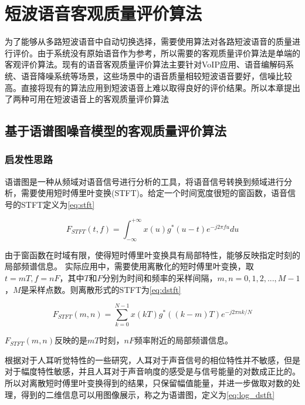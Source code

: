 \chapter{短波语音客观质量评价算法}
\label{chapter:algorithms}

为了能够从多路短波语音中自动切换选择，需要使用算法对各路短波语音的质量进行评价。由于系统没有原始语音作为参考，所以需要的客观质量评价算法是单端的客观评价算法。现有的语音客观质量评价算法主要针对VoIP应用、语音编解码系统、语音降噪系统等场景，这些场景中的语音质量相较短波语音要好，信噪比较高。直接将现有的算法应用到短波语音上难以取得良好的评价结果。所以本章提出了两种可用在短波语音上的客观质量评价算法

\section{基于语谱图噪音模型的客观质量评价算法}

\subsection{启发性思路} \label{section:alg1-1}

语谱图是一种从频域对语音信号进行分析的工具，将语音信号转换到频域进行分析，需要使用短时傅里叶变换(STFT)。给定一个时间宽度很短的窗函数，语音信号的STFT定义为\ref{eq:stft}

\begin{equation}\label{eq:stft}
F_{STFT}(t, f) = \int_{-\infty}^{+\infty}x(u)g^*(u-t)e^{-j2\pi fu}du
\end{equation}

由于窗函数在时域有限，使得短时傅里叶变换具有局部特性，能够反映指定时刻的局部频谱信息。
实际应用中，需要使用离散化的短时傅里叶变换，取$t=mT, f=nF$，其中$T$和$F$分别为时间和频率的采样间隔，$m,n=0,1,2,...,M-1$，$M$是采样点数。则离散形式的STFT为\ref{eq:dstft}

\begin{equation}\label{eq:dstft}
F_{STFT}(m, n) = \sum_{k=0}^{N-1}x(kT)g^*((k-m)T)e^{-j2\pi nk/N}
\end{equation}

$F_{STFT}(m, n)$反映的是$mT$时刻，$nF$频率附近的局部频谱信息。

根据对于人耳听觉特性的一些研究，人耳对于声音信号的相位特性并不敏感，但是对于幅度特性敏感，并且人耳对于声音响度的感受是与信号能量的对数成正比的。所以对离散短时傅里叶变换得到的结果，只保留幅值能量，并进一步做取对数的处理，得到的二维信息可以用图像展示，称之为语谱图，定义为\ref{eq:log_dstft}

